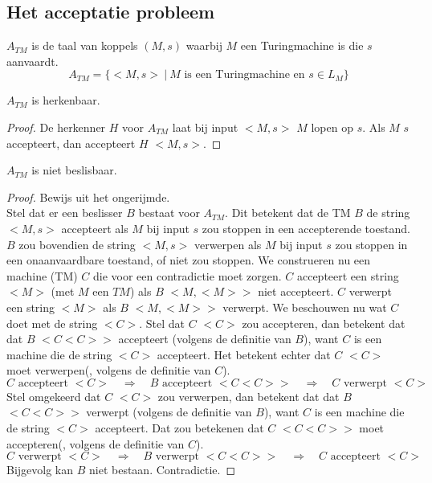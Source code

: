 \documentclass[main.tex]{subfiles}
\begin{document}
\subsection{Het acceptatie probleem}
\label{sec:het-acceptatie-probleem}

\begin{de}
  \label{de:a-tm}
  $A_{TM}$ is de taal van koppels $(M,s)$ waarbij $M$ een Turingmachine is die $s$ aanvaardt.
  \[ A_{TM} = \{ <M,s> \ |\ M \text{ is een Turingmachine en } s \in L_{M} \} \]
\end{de}

\begin{st}
  \label{st:a-tm-herk}
  $A_{TM}$ is herkenbaar.
  \begin{proof}
    De herkenner $H$ voor $A_{TM}$ laat bij input $<M,s>$ $M$ lopen op $s$.
    Als $M$ $s$ accepteert, dan accepteert $H$ $<M,s>$.
  \end{proof}
\end{st}

\begin{st}
  \label{st:a-tm-niet-besl}
  $A_{TM}$ is niet beslisbaar.

  \begin{proof}
    Bewijs uit het ongerijmde.\\
    Stel dat er een beslisser $B$ bestaat voor $A_{TM}$.
    Dit betekent dat de TM $B$ de string $<M,s>$ accepteert als $M$ bij input $s$ zou stoppen in een accepterende toestand.
    $B$ zou bovendien de string $<M,s>$ verwerpen als $M$ bij input $s$ zou stoppen in een onaanvaardbare toestand, of niet zou stoppen.
    We construeren nu een machine (TM) $C$ die voor een contradictie moet zorgen.
    $C$ accepteert een string $<M>$ (met $M$ een $TM$) als $B$ $<M,<M>>$ niet accepteert.
    $C$ verwerpt een string $<M>$ als $B$ $<M,<M>>$ verwerpt.
    We beschouwen nu wat $C$ doet met de string $<C>$.
    Stel dat $C$ $<C>$ zou accepteren, dan betekent dat dat $B$ $<C<C>>$ accepteert (volgens de definitie van $B$), want $C$ is een machine die de string $<C>$ accepteert.
    Het betekent echter dat $C$ $<C>$ moet verwerpen(, volgens de definitie van $C$).
    \[ C \text{ accepteert } <C> \quad\Rightarrow\quad B \text{ accepteert } <C<C>> \quad\Rightarrow\quad C \text{ verwerpt } <C> \]
    Stel omgekeerd dat $C$ $<C>$ zou verwerpen, dan betekent dat dat $B$ $<C<C>>$ verwerpt (volgens de definitie van $B$), want $C$ is een machine die de string $<C>$ accepteert.
    Dat zou betekenen dat $C$ $<C<C>>$ moet accepteren(, volgens de definitie van $C$).
    \[ C \text{ verwerpt } <C> \quad\Rightarrow\quad B \text{ verwerpt } <C<C>> \quad\Rightarrow\quad C \text{ accepteert } <C> \]
    Bijgevolg kan $B$ niet bestaan.
    Contradictie.
  \end{proof}
\end{st}
\end{document}
